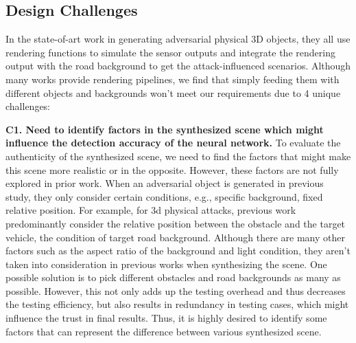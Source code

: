 \subsection{Design Challenges}
In the state-of-art work in generating adversarial physical 3D objects,
they all use rendering functions to simulate the sensor outputs and integrate the rendering output with the road background to get the attack-influenced scenarios.
Although many works provide rendering pipelines, we find that simply feeding them with different objects and backgrounds won't meet our requirements due to 4 unique challenges:

\textbf{C1. Need to identify factors in the synthesized scene which might influence the detection accuracy of the neural network.}
To evaluate the authenticity of the synthesized scene, we need to find the factors that might make this scene more realistic or in the opposite.
However, these factors are not fully explored in prior work.
When an adversarial object is generated in previous study, they only consider certain conditions, e.g., specific background, fixed relative position.
For example, for 3d physical attacks, previous work predominantly consider the relative position between the obstacle and the target vehicle\cite{25}, 
the condition of target road background\cite{msf-adv, lidar1}. 
Although there are many other factors such as the aspect ratio of the background and light condition, 
they aren't taken into consideration in previous works when synthesizing the scene.
One possible solution is to pick different obstacles and road backgrounds as many as possible.
However, this not only adds up the testing overhead and thus decreases the testing efficiency, 
but also results in redundancy in testing cases, which might influence the trust in final results.
Thus, it is highly desired to identify some factors that can represent the difference between various synthesized scene.

